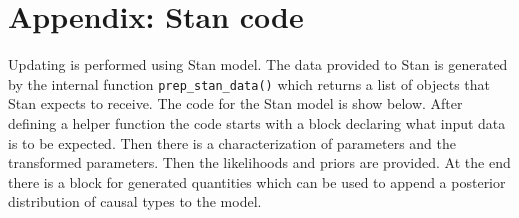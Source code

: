 \documentclass[
  11pt,
  article]{jss}
\begin{document}
\hypertarget{appendix-stan-code}{%
\section{Appendix: Stan code}\label{appendix-stan-code}}

Updating is performed using Stan model. The data provided to Stan is
generated by the internal function \texttt{prep\_stan\_data()} which
returns a list of objects that Stan expects to receive. The code for the
Stan model is show below. After defining a helper function the code
starts with a block declaring what input data is to be expected. Then
there is a characterization of parameters and the transformed
parameters. Then the likelihoods and priors are provided. At the end
there is a block for generated quantities which can be used to append a
posterior distribution of causal types to the model.
\end{document}
